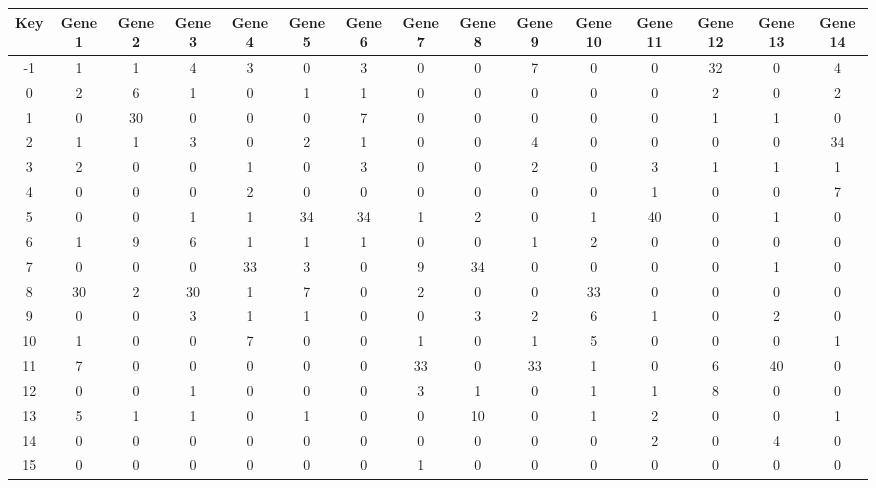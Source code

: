 \begin{tabular}{|c|c|c|c|c|c|c|c|c|c|c|c|c|c|c|}
\hline
Key & Gene 1 & Gene 2 & Gene 3 & Gene 4 & Gene 5 & Gene 6 & Gene 7 & Gene 8 & Gene 9 & Gene 10 & Gene 11 & Gene 12 & Gene 13 & Gene 14 \\
\hline
-1 & 1 & 1 & 4 & 3 & 0 & 3 & 0 & 0 & 7 & 0 & 0 & 32 & 0 & 4 \\
0 & 2 & 6 & 1 & 0 & 1 & 1 & 0 & 0 & 0 & 0 & 0 & 2 & 0 & 2 \\
1 & 0 & 30 & 0 & 0 & 0 & 7 & 0 & 0 & 0 & 0 & 0 & 1 & 1 & 0 \\
2 & 1 & 1 & 3 & 0 & 2 & 1 & 0 & 0 & 4 & 0 & 0 & 0 & 0 & 34 \\
3 & 2 & 0 & 0 & 1 & 0 & 3 & 0 & 0 & 2 & 0 & 3 & 1 & 1 & 1 \\
4 & 0 & 0 & 0 & 2 & 0 & 0 & 0 & 0 & 0 & 0 & 1 & 0 & 0 & 7 \\
5 & 0 & 0 & 1 & 1 & 34 & 34 & 1 & 2 & 0 & 1 & 40 & 0 & 1 & 0 \\
6 & 1 & 9 & 6 & 1 & 1 & 1 & 0 & 0 & 1 & 2 & 0 & 0 & 0 & 0 \\
7 & 0 & 0 & 0 & 33 & 3 & 0 & 9 & 34 & 0 & 0 & 0 & 0 & 1 & 0 \\
8 & 30 & 2 & 30 & 1 & 7 & 0 & 2 & 0 & 0 & 33 & 0 & 0 & 0 & 0 \\
9 & 0 & 0 & 3 & 1 & 1 & 0 & 0 & 3 & 2 & 6 & 1 & 0 & 2 & 0 \\
10 & 1 & 0 & 0 & 7 & 0 & 0 & 1 & 0 & 1 & 5 & 0 & 0 & 0 & 1 \\
11 & 7 & 0 & 0 & 0 & 0 & 0 & 33 & 0 & 33 & 1 & 0 & 6 & 40 & 0 \\
12 & 0 & 0 & 1 & 0 & 0 & 0 & 3 & 1 & 0 & 1 & 1 & 8 & 0 & 0 \\
13 & 5 & 1 & 1 & 0 & 1 & 0 & 0 & 10 & 0 & 1 & 2 & 0 & 0 & 1 \\
14 & 0 & 0 & 0 & 0 & 0 & 0 & 0 & 0 & 0 & 0 & 2 & 0 & 4 & 0 \\
15 & 0 & 0 & 0 & 0 & 0 & 0 & 1 & 0 & 0 & 0 & 0 & 0 & 0 & 0 \\
\hline
\end{tabular}